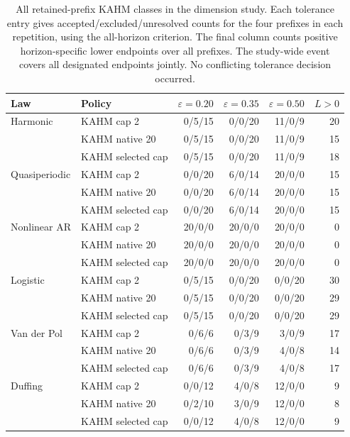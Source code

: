 \begin{table}[t]
\centering\small
\setlength{\tabcolsep}{4pt}
\begin{tabular}{@{}llrrrr@{}}
\toprule
Law & Policy & $\varepsilon=0.20$ & $\varepsilon=0.35$ & $\varepsilon=0.50$ & $L>0$ \\
\midrule
Harmonic & KAHM cap 2 & 0/5/15 & 0/0/20 & 11/0/9 & 20 \\
 & KAHM native 20 & 0/5/15 & 0/0/20 & 11/0/9 & 15 \\
 & KAHM selected cap & 0/5/15 & 0/0/20 & 11/0/9 & 18 \\
\addlinespace
Quasiperiodic & KAHM cap 2 & 0/0/20 & 6/0/14 & 20/0/0 & 15 \\
 & KAHM native 20 & 0/0/20 & 6/0/14 & 20/0/0 & 15 \\
 & KAHM selected cap & 0/0/20 & 6/0/14 & 20/0/0 & 15 \\
\addlinespace
Nonlinear AR & KAHM cap 2 & 20/0/0 & 20/0/0 & 20/0/0 & 0 \\
 & KAHM native 20 & 20/0/0 & 20/0/0 & 20/0/0 & 0 \\
 & KAHM selected cap & 20/0/0 & 20/0/0 & 20/0/0 & 0 \\
\addlinespace
Logistic & KAHM cap 2 & 0/5/15 & 0/0/20 & 0/0/20 & 30 \\
 & KAHM native 20 & 0/5/15 & 0/0/20 & 0/0/20 & 29 \\
 & KAHM selected cap & 0/5/15 & 0/0/20 & 0/0/20 & 29 \\
\addlinespace
Van der Pol & KAHM cap 2 & 0/6/6 & 0/3/9 & 3/0/9 & 17 \\
 & KAHM native 20 & 0/6/6 & 0/3/9 & 4/0/8 & 14 \\
 & KAHM selected cap & 0/6/6 & 0/3/9 & 4/0/8 & 17 \\
\addlinespace
Duffing & KAHM cap 2 & 0/0/12 & 4/0/8 & 12/0/0 & 9 \\
 & KAHM native 20 & 0/2/10 & 3/0/9 & 12/0/0 & 8 \\
 & KAHM selected cap & 0/0/12 & 4/0/8 & 12/0/0 & 9 \\
\bottomrule
\end{tabular}
\caption{All retained-prefix KAHM classes in the dimension study.
Each tolerance entry gives accepted/excluded/unresolved counts for the
four prefixes in each repetition, using the all-horizon criterion.
The final column counts positive horizon-specific lower endpoints
over all prefixes. The study-wide event covers all designated
endpoints jointly. No conflicting tolerance decision occurred.}
\label{tab:dimension-policy-resolution}
\end{table}

